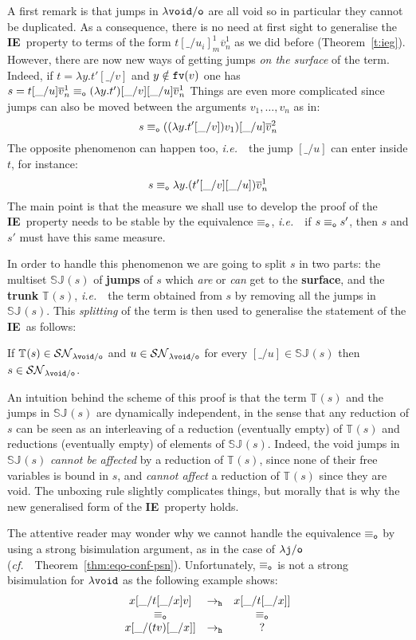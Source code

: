 \documentclass{LMCS}
\newcommand{\ie}{{\it  i.e.}~}
\newcommand{\cf}{{\it  cf.}~}
\renewcommand{\>}{\rightarrow}
\def\lam{\lambda}
\newcommand{\Rew}[1]{\rightarrow_{#1}}
\newcommand{\SN}[1]{\mathcal{SN}_{#1}}
\newcommand{\dis}{{\tt j}}
\newcommand{\ldis}{\lam{\dis}}
\newcommand{\fv}[1]{{\tt fv}(#1)}
\newcommand{\deft}[1]{{\bf #1}}
\newcommand{\iep}{{\bf IE}}
\newcommand{\modulo}[2]{#1/#2}
\newcommand{\espv}[4]{[\void/{#2}_i]^{#3}_{#4}}
\newcommand{\ovl}[3]{\overline{#1}^{#2}_{#3}}
\newcommand{\eqo}{\equiv_\osym}
\newcommand{\osym}{{\tt o}}
\newcommand{\ldiso}{\ldis/{\osym}}
\newcommand{\osymb}{{\tt o}}
\newcommand{\aux}{{\tt void}}
\newcommand{\laux}{\lam\aux}
\newcommand{\lauxm}{\lam\modulo{ \aux }{ \osymb }}
\newcommand{\New}{{\tt h}}
\newcommand{\surf}[2]{\mathbb{T}_{#1}(#2)}
\newcommand{\preetamd}[2]{\mathbb{SJ}_{#1}(#2)}
\newcommand{\void}{\_}
\begin{document}
A first remark is that jumps
in $\lauxm$ are all void  so in particular 
they
cannot be duplicated. As a consequence, 
there is no need at first sight to generalise the \iep\ property to terms of
the form $t\espv{x}{u}{1}{m} \ovl{v}{1}{n}$ as we did before 
(Theorem~\ref{t:ieg}). However,
there are now new ways of getting jumps 
\textit{on the surface} of
the term. Indeed, if $t=\lam y. t'[\void/v]$ and $y\notin\fv{v}$ one 
has $s =t[\void/u] \ovl{v}{1}{n} \eqo (\lam y. t')[\void/v][\void/u] \ovl{v}{1}{n}$
Things are even more complicated since jumps
can also be moved between the arguments $v_1,\ldots,v_n$
as in: 
$$s\eqo ((\lam y. t'[\void/v]) v_1)[\void/u] \ovl{v}{2}{n}$$ 
The opposite phenomenon can happen too, \ie\
the jump $[\void/u]$ can enter inside $t$, for instance:
$$s\eqo \lam y.(t'[\void/v][\void/u]) \ovl{v}{1}{n}$$ 
The main point is that the
measure we shall use to develop the proof of the \iep\ property needs to be stable by 
the equivalence $\eqo$, \ie\ 
if $s \eqo s'$, then $s$ and $s'$
must have this same measure. 

In order to handle this phenomenon we are going to split $s$ in two
parts: the multiset $\preetamd{}{s}$ of \deft{jumps} of $s$
which \textit{are} or \textit{can} get to the \deft{surface}, and the 
\deft{trunk}
$\surf{}{s}$, \ie\  the term obtained from $s$ by removing all the jumps in
$\preetamd{}{s}$. This \textit{splitting} of the term is then used to
generalise the statement of the \iep\ as follows:

\begin{center}
If $\surf{}{s}\in\SN{\lauxm}$ and $u\in\SN{\lauxm}$ for every 
$[\void/u]\in \preetamd{}{s}$ then $s\in\SN{\lauxm}$.
\end{center}



An intuition behind the scheme of this proof is that the term
$\surf{}{s}$ and the jumps in $\preetamd{}{s}$ are dynamically
independent, in the sense that any reduction of $s$ can be seen as an
interleaving of a reduction (eventually empty) of $\surf{}{s}$ and
reductions (eventually empty) of elements of $\preetamd{}{s}$. Indeed,
the void jumps in $\preetamd{}{s}$ \textit{cannot be affected} by a
reduction of $\surf{}{s}$, since none of their free variables is bound
in $s$, and \textit{cannot affect} a reduction of $\surf{}{s}$ since
they are void. The unboxing rule slightly complicates things, but
morally that is why the new generalised form of the
\iep\ property holds.\medskip

The attentive reader
may wonder why we cannot handle the equivalence $\eqo$ by using a strong
bisimulation argument, as in the case of $\ldiso$ (\cf\ Theorem~\ref{thm:eqo-conf-psn}). 
Unfortunately, $\eqo$ is not a strong bisimulation 
for $\laux$ as the following example shows:
 \[ \begin{array}{cccc@{\hspace{1cm}}c@{\hspace{1cm}}ccccc}
  x[\void/t[\void/x] v]				& \Rew{\New}	& x[\void/t[\void/x]]	\\
  \eqo	&		&	\eqo\\
  x[\void/(t v)[\void/x]]				&	\Rew{\New}& ?	\\
 \end{array}
\]
\end{document}
